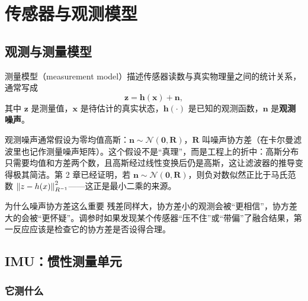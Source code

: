 \chapter{传感器与观测模型}\label{ch:03-sensors}


\section{观测与测量模型}\label{sec:03-model}

\begin{definition}[测量模型]
测量模型（measurement model）描述传感器读数与真实物理量之间的统计关系，通常写成
\begin{equation}
\bm{z}=\bm{h}(\bm{x})+\bm{n},
\end{equation}
其中 $\bm{z}$ 是测量值，$\bm{x}$ 是待估计的真实状态，$\bm{h}(\cdot)$ 是已知的观测函数，$\bm{n}$ 是\textbf{观测噪声}。
\end{definition}

观测噪声通常假设为零均值高斯：$\bm{n}\sim\mathcal{N}(\bm{0},\bm{R})$，$\bm{R}$ 叫噪声协方差（在卡尔曼滤波里也记作测量噪声矩阵）。这个假设不是“真理”，而是工程上的折中：高斯分布只需要均值和方差两个数，且高斯经过线性变换后仍是高斯，这让滤波器的推导变得极其简洁。第 2 章已经证明，若 $\bm{n}\sim\mathcal{N}(\bm{0},\bm{R})$，则负对数似然正比于马氏范数 $\left\lVert z-h(x) \right\rVert_{R^{-1}}^{2}$——这正是最小二乘的来源。

\begin{keybox}{为什么噪声协方差这么重要}
残差同样大，协方差小的观测会被“更相信”，协方差大的会被“更怀疑”。调参时如果发现某个传感器“压不住”或“带偏”了融合结果，第一反应应该是检查它的协方差是否设得合理。
\end{keybox}

\section{IMU：惯性测量单元}\label{sec:03-imu}

\subsection{它测什么}

